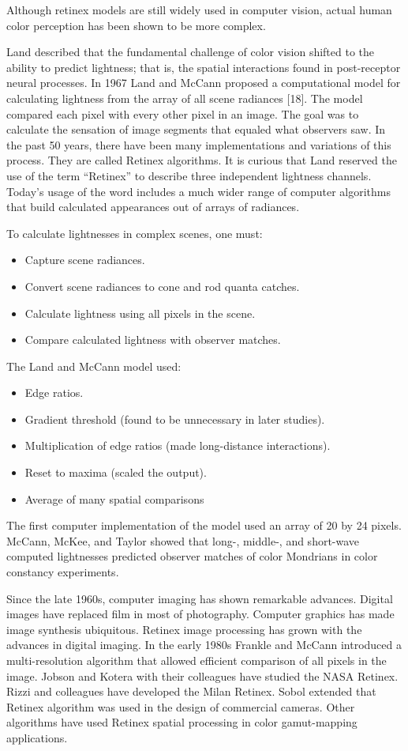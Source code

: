 Although retinex models are still widely used in computer vision, actual human color perception has been shown to be more complex.

Land described that the fundamental challenge of color vision shifted to the ability to predict lightness; that is, the spatial interactions found in post-receptor neural processes. In 1967 Land and McCann proposed a computational model for calculating lightness from the array of all scene radiances [18]. The model compared each pixel with every other pixel in an image. The goal was to calculate the sensation of image segments that equaled what observers saw. In the past 50 years, there have been many implementations and variations of this process. They are called Retinex algorithms. It is curious that Land reserved the use of the term “Retinex” to describe three independent lightness channels. Today’s usage of the word includes a much wider range of computer algorithms that build calculated appearances out of arrays of radiances.

To calculate lightnesses in complex scenes, one must:

\begin{itemize}
	\item Capture scene radiances.
	\item Convert scene radiances to cone and rod quanta catches.
	\item Calculate lightness using all pixels in the scene.
	\item Compare calculated lightness with observer matches.
\end{itemize}

The Land and McCann model used:
\begin{itemize}
	\item Edge ratios.
	\item Gradient threshold (found to be unnecessary in later studies).
	\item Multiplication of edge ratios (made long-distance interactions).
	\item Reset to maxima (scaled the output).
	\item Average of many spatial comparisons
\end{itemize}

The first computer implementation of the model used an array of 20 by 24 pixels. McCann, McKee, and Taylor showed that long-, middle-, and short-wave computed lightnesses predicted observer matches of color Mondrians in color constancy experiments.

Since the late 1960s, computer imaging has shown remarkable advances. Digital images have replaced film in most of photography. Computer graphics has made image synthesis ubiquitous. Retinex image processing has grown with the advances in digital imaging. In the early 1980s Frankle and McCann introduced a multi-resolution algorithm that allowed efficient comparison of all pixels in the image. Jobson and Kotera with their colleagues have studied the NASA Retinex. Rizzi and colleagues have developed the Milan Retinex. Sobol extended that Retinex algorithm was used in the design of commercial cameras. Other algorithms have used Retinex spatial processing in color gamut-mapping applications.

